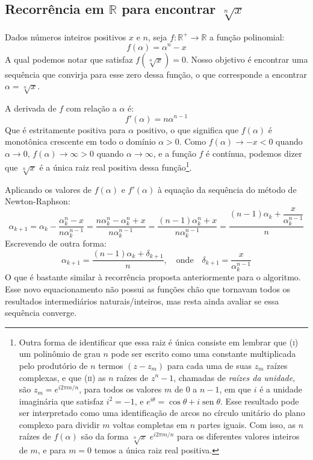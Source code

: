 \subsection*{Recorrência em $\mathds{R}$ para encontrar $\sqrt[n]{x}$}

Dados números inteiros positivos $x$ e $n$,
seja $f:\mathds{R}^+\to\mathds{R}$ a função polinomial:
\begin{equation}
  f(\alpha) = \alpha^n - x
\end{equation}
A qual podemos notar que satisfaz $f(\sqrt[n]{x}) = 0$.
Nosso objetivo é encontrar uma sequência
que convirja para esse zero dessa função,
o que corresponde a encontrar $\alpha = \sqrt[n]{x}$.

A derivada de $f$ com relação a $\alpha$ é:
\begin{equation}
  f'(\alpha) = n \alpha^{n - 1}
\end{equation}
Que é estritamente positiva para $\alpha$ positivo,
o que significa que $f(\alpha)$ é monotônica crescente
em todo o domínio $\alpha > 0$.
Como $f(\alpha) \to -x < 0$ quando $\alpha \to 0$,
$f(\alpha) \to \infty > 0$ quando $\alpha \to \infty$,
e a função $f$ é contínua,
podemos dizer que $\sqrt[n]{x}$
é a única raiz real positiva dessa função\footnote{
  Outra forma de identificar que essa raiz é única
  consiste em lembrar que
  \textsc{(i)} um polinômio de grau $n$
  pode ser escrito como uma constante
  multiplicada pelo produtório de $n$ termos $(z - z_m)$
  para cada uma de suas $z_m$ raízes complexas,
  e que \textsc{(ii)} as $n$ raízes de $z^n - 1$,
  chamadas de \emph{raízes da unidade},
  são $z_m = e^{i 2 \pi m / n}$,
  para todos os valores $m$ de $0$ a $n - 1$,
  em que $i$ é a unidade imaginária que satisfaz $i^2 = -1$,
  e $e^{i\theta} = \cos\theta + i\operatorname{sen}\theta$.
  Esse resultado pode ser interpretado como
  uma identificação de arcos no círculo unitário do plano complexo
  para dividir $m$ voltas completas em $n$ partes iguais.
  Com isso, as $n$ raízes de $f(\alpha)$
  são da forma $\sqrt[n]{x} \; e^{i 2 \pi m / n}$
  para os diferentes valores inteiros de $m$,
  e para $m = 0$ temos a única raiz real positiva.
}.

Aplicando os valores de $f(\alpha)$ e $f'(\alpha)$
à equação da sequência do método de Newton-Raphson:
\[
  \alpha_{k+1} =
    \alpha_k - \dfrac{\alpha_k^n - x}{n \alpha_k^{n-1}}
  =
    \dfrac{n \alpha_k^n - \alpha_k^n + x}{n \alpha_k^{n-1}}
  =
    \dfrac{(n-1) \alpha_k^n + x}{n \alpha_k^{n-1}}
  =
    \dfrac{(n-1) \alpha_k + \dfrac{x}{\alpha_k^{n-1}}}{n}
\]
Escrevendo de outra forma:
\begin{equation}
  \alpha_{k+1} = \dfrac{(n-1) \alpha_k + \delta_{k+1}}{n},
  \quad\text{onde}\quad
  \delta_{k+1} = \dfrac{x}{\alpha_k^{n-1}}
\end{equation}
O que é bastante similar à recorrência
proposta anteriormente para o algoritmo.
Esse novo equacionamento não possui as funções chão
que tornavam todos os resultados intermediários naturais/inteiros,
mas resta ainda avaliar se essa sequência converge.
